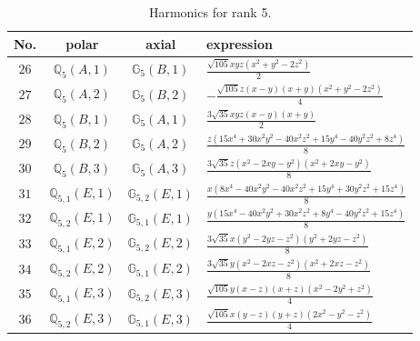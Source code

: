\documentclass[fleqn,8pt,landscape]{jsarticle}
\begin{document}
\begin{table}[ht!]
\begin{center}
\caption{Harmonics for rank 5.}
\renewcommand{\arraystretch}{1.3}
\begin{tabular}{cccl} \hline \hline
No. & polar & axial & expression \\ \hline
$ 26 $ & $ \mathbb{Q}_{5}(A,1) $ & $ \mathbb{G}_{5}(B,1) $ & $ \frac{\sqrt{105} x y z \left(x^{2} + y^{2} - 2 z^{2}\right)}{2} $ \\
$ 27 $ & $ \mathbb{Q}_{5}(A,2) $ & $ \mathbb{G}_{5}(B,2) $ & $ - \frac{\sqrt{105} z \left(x - y\right) \left(x + y\right) \left(x^{2} + y^{2} - 2 z^{2}\right)}{4} $ \\
$ 28 $ & $ \mathbb{Q}_{5}(B,1) $ & $ \mathbb{G}_{5}(A,1) $ & $ \frac{3 \sqrt{35} x y z \left(x - y\right) \left(x + y\right)}{2} $ \\
$ 29 $ & $ \mathbb{Q}_{5}(B,2) $ & $ \mathbb{G}_{5}(A,2) $ & $ \frac{z \left(15 x^{4} + 30 x^{2} y^{2} - 40 x^{2} z^{2} + 15 y^{4} - 40 y^{2} z^{2} + 8 z^{4}\right)}{8} $ \\
$ 30 $ & $ \mathbb{Q}_{5}(B,3) $ & $ \mathbb{G}_{5}(A,3) $ & $ \frac{3 \sqrt{35} z \left(x^{2} - 2 x y - y^{2}\right) \left(x^{2} + 2 x y - y^{2}\right)}{8} $ \\
$ 31 $ & $ \mathbb{Q}_{5,1}(E,1) $ & $ \mathbb{G}_{5,2}(E,1) $ & $ \frac{x \left(8 x^{4} - 40 x^{2} y^{2} - 40 x^{2} z^{2} + 15 y^{4} + 30 y^{2} z^{2} + 15 z^{4}\right)}{8} $ \\
$ 32 $ & $ \mathbb{Q}_{5,2}(E,1) $ & $ \mathbb{G}_{5,1}(E,1) $ & $ \frac{y \left(15 x^{4} - 40 x^{2} y^{2} + 30 x^{2} z^{2} + 8 y^{4} - 40 y^{2} z^{2} + 15 z^{4}\right)}{8} $ \\
$ 33 $ & $ \mathbb{Q}_{5,1}(E,2) $ & $ \mathbb{G}_{5,2}(E,2) $ & $ \frac{3 \sqrt{35} x \left(y^{2} - 2 y z - z^{2}\right) \left(y^{2} + 2 y z - z^{2}\right)}{8} $ \\
$ 34 $ & $ \mathbb{Q}_{5,2}(E,2) $ & $ \mathbb{G}_{5,1}(E,2) $ & $ \frac{3 \sqrt{35} y \left(x^{2} - 2 x z - z^{2}\right) \left(x^{2} + 2 x z - z^{2}\right)}{8} $ \\
$ 35 $ & $ \mathbb{Q}_{5,1}(E,3) $ & $ \mathbb{G}_{5,2}(E,3) $ & $ \frac{\sqrt{105} y \left(x - z\right) \left(x + z\right) \left(x^{2} - 2 y^{2} + z^{2}\right)}{4} $ \\
$ 36 $ & $ \mathbb{Q}_{5,2}(E,3) $ & $ \mathbb{G}_{5,1}(E,3) $ & $ \frac{\sqrt{105} x \left(y - z\right) \left(y + z\right) \left(2 x^{2} - y^{2} - z^{2}\right)}{4} $ \\
 \hline \hline
\end{tabular}
\end{center}
\end{table}
\end{document}
